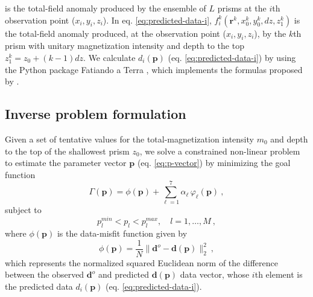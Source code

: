is the total-field anomaly produced by the ensemble of $L$ prisms at the $i$th observation point ($x_{i}, y_{i}, z_{i}$). In eq. \ref{eq:predicted-data-i}, $f_{i}^{k}(\mathbf{r}^{k}, x_{0}^{k}, y_{0}^{k}, dz, z_{1}^{k})$ is the total-field anomaly produced, at the observation point ($x_{i}, y_{i}, z_{i}$), by the $k$th prism with unitary magnetization intensity and depth to the top $z_{1}^{k} = z_{0} + (k-1)dz$. We calculate $d_{i} (\mathbf{p})$ (eq. \ref{eq:predicted-data-i}) by using the Python package Fatiando a Terra \cite[]{uieda-etal2013}, which implements the formulas proposed by \cite{plouff1976}.


\subsection{Inverse problem formulation}

Given a set of tentative values for the total-magnetization intensity $m_{0}$ and 
depth to the top of the shallowest prism $z_{0}$, we solve a constrained non-linear 
problem to estimate the parameter vector $\mathbf{p}$ (eq. \ref{eq:p-vector}) 
by minimizing the goal function
\begin{equation}
\Gamma (\mathbf{p}) = \phi (\mathbf{p}) + \sum\limits^{7}_{\ell =1} \alpha_{\ell} \, \varphi_{\ell}(\mathbf{p}) \: ,
\label{eq:gamma}
\end{equation}
subject to
\begin{equation}
p_{l}^{min} < p_{l} < p_{l}^{max}, \quad l = 1, \dots, M \: ,
\label{eq:inequality-constraint}
\end{equation}
where $\phi (\mathbf{p})$ is the data-misfit function given by
\begin{equation}\label{eq:misfit}
\phi (\mathbf{p}) = \frac{1}{N} \| \mathbf{d}^{o} - \mathbf{d}(\mathbf{p}) \|_{2}^{2} \: ,
\end{equation}
which represents the normalized squared Euclidean norm of the difference between the 
observed $\mathbf{d}^{o}$ and predicted $\mathbf{d}(\mathbf{p})$ data vector,
whose $i$th element is the predicted data $d_{i} (\mathbf{p})$ 
(eq. \ref{eq:predicted-data-i}).

